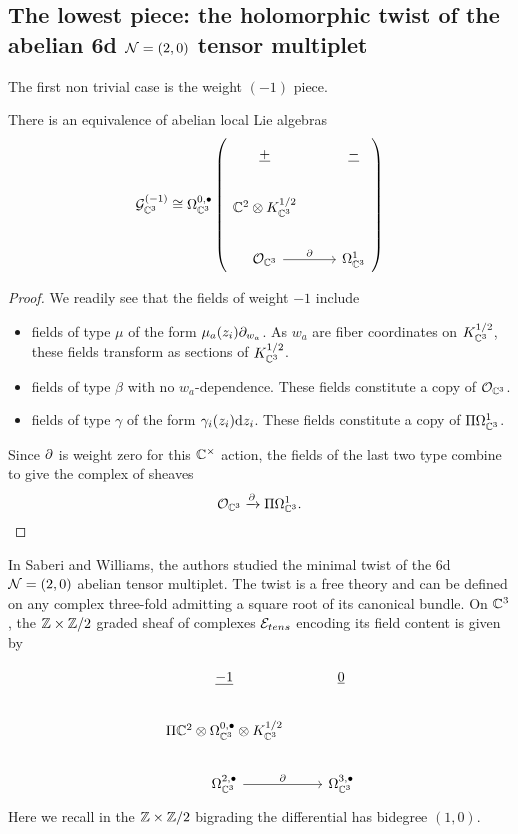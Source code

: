 \subsection{The lowest piece: the holomorphic twist of the abelian 6d $\mathcal{N}=(2,0)$ tensor multiplet}\label{subsec:g-1}

The first non trivial case is the weight $(-1)$ piece.

\begin{lem}
There is an equivalence of abelian local Lie algebras 
\[
\mc{G}_{\C^3} ^{(-1)}\cong \Omega^{0,\bullet}_{\C^3} \left ( 
\begin{tikzcd}
\ul{+} & \ul{-} \\
\C^2\otimes K^{1/2}_{\C^3} & \\ 
\mc{O}_{\C^3} \ar[r, "\del"] & \Omega^1_{\C^3} 
\end{tikzcd}
\right )
\] 
\end{lem}
\begin{proof}
We readily see that the fields of weight $-1$ include
\begin{itemize}
\item 
fields of type $\mu$ of the form $\mu_a (z_i)\partial_{w_a}$. As $w_a$ are fiber coordinates on $K^{1/2}_{\mathbb{C}^3}$, these fields transform as sections of $K^{1/2}_{\mathbb{C}^3}$. 
\item 
fields of type $\beta$ with no $w_a$-dependence. These fields constitute a copy of $\mathcal{O}_{\mathbb{C}^3}$.
\item 
fields of type $\gamma$ of the form $\gamma_i(z_i)\mathrm{d} z_i$. These fields constitute a copy of $\Pi \Omega^1_{\mathbb{C}^3}$. 
\end{itemize}
Since $\partial$ is weight zero for this $\mathbb{C}^\times$ action, the fields of the last two type combine to give the complex of sheaves
\[
\mathcal{O}_{\mathbb{C}^3}  \xrightarrow{\partial} \Pi \Omega^{1}_{\mathbb{C}^3}  .
\]

\end{proof}

\parsec[]
In \cite{SWtensor} Saberi and Williams, the authors studied the minimal twist of the 6d $\mathcal{N}=(2,0)$ abelian tensor multiplet. The twist is a free theory and can be defined on any complex three-fold admitting a square root of its canonical bundle. On $\mathbb{C}^3$, the $\mathbb{Z}\times \mathbb{Z}/2$ graded sheaf of complexes $\mathcal{E}_{tens}$ encoding its field content is given by 

\begin{equation}
\begin{tikzcd}
\ul{-1} & \ul{0} \\
\Pi \C^2\otimes \Omega^{0,\bullet}_{\C^3} \otimes  K_{\C^3}^{1/2}  & \\
\Omega^{2,\bullet}_{\C^3} \ar[r,"\del"] & \Omega^{3,\bullet}_{\C^3} 
\end{tikzcd} 
\end{equation}
Here we recall in the $\mathbb{Z} \times \mathbb{Z}/2$ bigrading the differential has bidegree $(1,0)$. 

